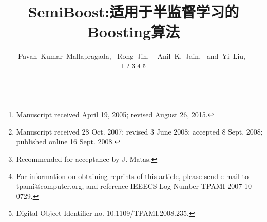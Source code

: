\documentclass[10pt,journal,compsoc]{IEEEtran}
\begin{document}
%
\title{SemiBoost:适用于半监督学习的Boosting算法}
%
%
%
%

\author{Pavan~Kumar~Mallapragada,~
					Rong~Jin, ~
					Anil~K.~Jain,~
					and~Yi~Liu,~%
        
\thanks{Manuscript received April 19, 2005; revised August 26, 2015.}
\thanks{Manuscript received 28 Oct. 2007; revised 3 June 2008; accepted 8 Sept. 2008; published online 16 Sept. 2008.}
\thanks{Recommended for acceptance by J. Matas.}
\thanks{For information on obtaining reprints of this article, please send e-mail to tpami@computer.org, and reference IEEECS Log Number TPAMI-2007-10-0729.}
\thanks{Digital Object Identifier no. 10.1109/TPAMI.2008.235.}
}
\end{document}
